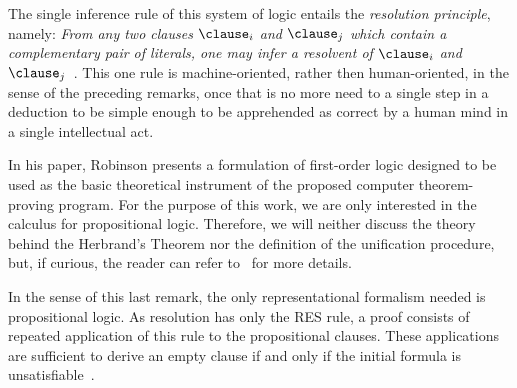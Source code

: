The single inference rule of this system of logic entails the \emph{resolution
principle}, namely: \emph{From any two clauses} $\clause_i$ \emph{and}
$\clause_j$ \emph{which contain a complementary pair of literals, one may infer
a resolvent of} $\clause_i$ \emph{and} $\clause_j$~\cite{Robinson65}. This one
rule is machine-oriented, rather then human-oriented, in the sense of the
preceding remarks, once that is no more need to a single step in a deduction to
be simple enough to be apprehended as correct by a human mind in a single
intellectual act.

In his paper, Robinson presents a formulation of first-order logic designed to
be used as the basic theoretical instrument of the proposed computer
theorem-proving program. For the purpose of this work, we are only interested in
the calculus for propositional logic. Therefore, we will neither discuss the theory
behind the Herbrand's Theorem nor the definition of the unification procedure,
but, if curious, the reader can refer to~\cite{Robinson65} for more details.

In the sense of this last remark, the only representational formalism needed is
propositional logic. As resolution has only the RES rule, a proof consists of
repeated application of this rule to the propositional clauses. These
applications are sufficient to derive an empty clause if and only if the initial
formula is unsatisfiable~\cite{satchapter}.

